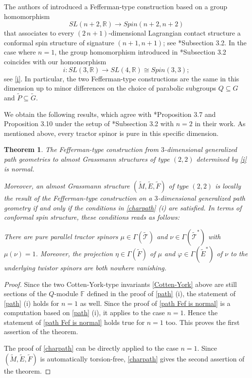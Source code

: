 \documentclass[11pt]{amsart}
\newtheorem{theorem}[proposition]{Theorem}
\begin{document}
The authors of \cite{Ham+17} introduced a Fefferman-type construction based on a group homomorphism 
\[SL(n+2,\mathbb R)\to Spin(n+2,n+2)\] 
that associates to every $(2\,n+1)$-dimensional Lagrangian contact structure a conformal spin structure of signature $(n+1,n+1)$; see \cite{Ham+17}*{Subsection 3.2}. In the case where $n=1$, the group homomorphism introduced in \cite{Ham+17}*{Subsection 3.2} coincides with our homomorphism \[i:SL(3,\mathbb R)\to SL(4,\mathbb R)\cong Spin(3,3);\] see \eqref{i}. In particular, the two Fefferman-type constructions are the same in this dimension up to minor differences on the choice of parabolic subgroups $Q\subseteq G$ and $\tilde P\subseteq\tilde G$.

We obtain the following results, which agree with \cite{Ham+17}*{Proposition 3.7 and Proposition 3.10} under the setup of \cite{Ham+17}*{Subsection 3.2} with $n=2$ in their work. As mentioned above, every tractor spinor is pure in this specific dimension.

\begin{theorem}
The Fefferman-type construction from $3$-dimensional generalized path geometries to almost Grassmann structures of type $(2,2)$ determined by \eqref{i} is normal.

Moreover, an almost Grassmann structure $(\tilde M,\tilde E,\tilde F)$ of type $(2,2)$ is locally the result of the Fefferman-type construction on a $3$-dimensional generalized path geometry if and only if the conditions in \cref{charpath} (i) are satisfied. In terms of conformal spin structure, these conditions reads as follows:

There are pure parallel tractor spinors $\mu\in\Gamma(\tilde{\mathcal T})$ and $\nu\in\Gamma(\tilde{\mathcal T}^*)$ with $\mu(\nu)=1$. Moreover, the projection $\eta\in\Gamma(\tilde F)$ of $\mu$ and $\varphi\in\Gamma(\tilde E^*)$ of $\nu$ to the underlying twistor spinors are both nowhere vanishing.
\end{theorem}

\begin{proof}
Since the two Cotten-York-type invariants \eqref{Cotten-York} above are still sections of the $Q$-module $\mathbb F$ defined in the proof of \cref{path} (i), the statement of \cref{path} (i) holds for $n=1$ as well. Since the proof of \cref{path Fef is normal} is a computation based on \cref{path} (i), it applies to the case $n=1$. Hence the statement of \cref{path Fef is normal} holds true for $n=1$ too. This proves the first assertion of the theorem.

The proof of \cref{charpath} can be directly applied to the case $n=1$. Since $(\tilde M,\tilde E,\tilde F)$ is automatically torsion-free, \cref{charpath} gives the second assertion of the theorem.
\end{proof}
\end{document}
